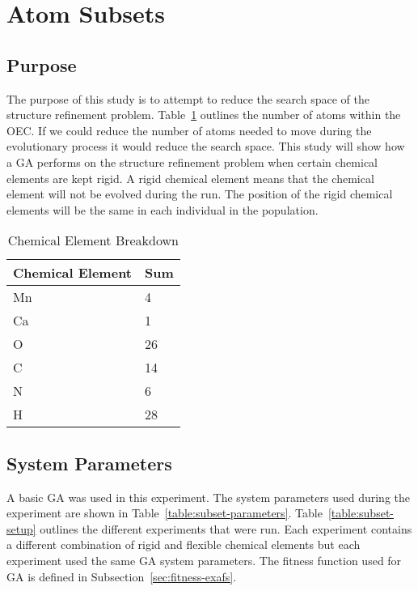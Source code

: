\section{Atom Subsets}

\subsection{Purpose}

The purpose of this study is to attempt to reduce the search space of the structure refinement problem. Table~\ref{table:atom-breakdown} outlines the number of atoms within the OEC. If we could reduce the number of atoms needed to move during the evolutionary process it would reduce the search space. This study will show how a GA performs on the structure refinement problem when certain chemical elements are kept rigid. A rigid chemical element means that the chemical element will not be evolved during the run. The position of the rigid chemical elements will be the same in each individual in the population. 

\begin{table}
	\centering
	\begin{tabular}{ | l | l | }
		\hline
		\textbf{Chemical Element} & \textbf{Sum} \\ \hline
		Mn & 4 \\ \hline
		Ca & 1 \\ \hline
		O & 26 \\ \hline
		C & 14 \\ \hline
		N & 6 \\ \hline
		H & 28 \\ \hline
	\end{tabular}
	\caption{Chemical Element Breakdown}
	\label{table:atom-breakdown}
\end{table}

\subsection{System Parameters}

A basic GA was used in this experiment. The system parameters used during the experiment are shown in Table~\ref{table:subset-parameters}. Table~\ref{table:subset-setup} outlines the different experiments that were run. Each experiment contains a different combination of rigid and flexible chemical elements but each experiment used the same GA system parameters. The fitness function used for GA is defined in Subsection~\ref{sec:fitness-exafs}.

